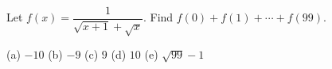 Let $f(x)=\dfrac{1}{\sqrt{x+1}+\sqrt x}$. Find $f(0)+f(1)+\cdots+f(99)$.

(a) $-10$ \quad (b) $-9$ \quad (c) $9$ \quad (d) $10$ \quad (e) $\sqrt{99}-1$
